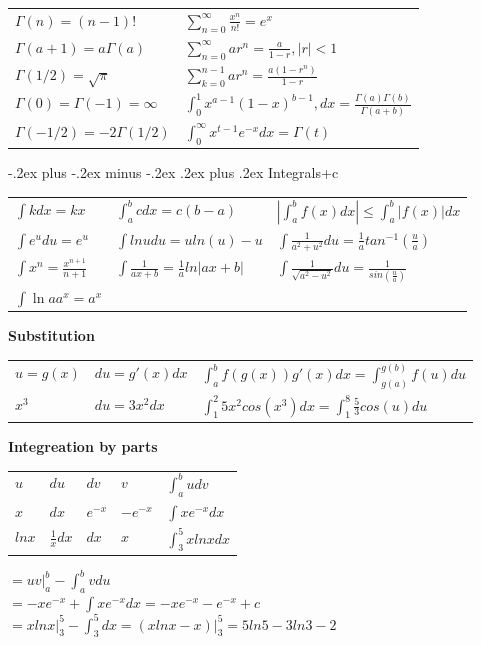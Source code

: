 \documentclass[10pt,landscape]{article}
\makeatletter
\renewcommand{\subsubsection}{\@startsection{subsubsection}{3}{0mm}%
                                {-.2ex plus -.2ex minus -.2ex}%
                                {.2ex plus .2ex}%
                                {\normalfont\small\bfseries}}
\makeatother
\begin{document}
\begin{multicols}{1}
\begin{tabular}{ l|l }
$\Gamma(n)=(n-1)!$           & $\sum_{n=0}^{\infty}\frac{x^n}{n!}=e^x$ \\
$\Gamma(a+1)=a\Gamma(a)$     & $\sum_{n=0}^{\infty}{ar^n}=\frac{a}{1-r}, |r|<1$ \\
$\Gamma(1/2)=\sqrt\pi$       & $\sum_{k=0}^{n-1}{ar^n}=\frac{a(1-r^n)}{1-r}$ \\
$\Gamma(0)=\Gamma(-1)=\infty$& $\int_0^1 x^{a - 1}(1-x)^{b-1}, dx = \frac{\Gamma(a)\Gamma(b)}{\Gamma(a+b)}$ \\
$\Gamma(-1/2)=-2\Gamma(1/2)$ & $\int_0^\infty x^{t-1}e^{-x}dx = \Gamma(t)$ 
\end{tabular}


  \subsubsection{Integrals+c}

\begin{tabular}{ l|l|l }
$\int{k}dx=kx$ & $\int_a^b{c}dx=c(b-a)$   & $|\int_a^b{f(x)}dx|\le \int_a^b|{f(x)}|dx$ \\
$\int{e^u}du=e^u$ & $\int{lnu}du=uln(u)-u$& $\int\frac1{a^2+u^2}du=\frac1{a}tan^{-1}(\frac{u}a)$ \\
$\int{x^n}=\frac{x^{n+1}}{n+1}$ & $\int\frac1{ax+b}=\frac{1}aln|ax+b|$ & $\int\frac1{\sqrt{a^2-u^2}}du=\frac1{sin(\frac{u}a)}$ \\
$\int{\ln{a}a^x}=a^x$ &
\end{tabular}

\textbf{Substitution}
\begin{tabular}{ l|l|l }
$u=g(x)$ & $du=g'(x)dx$ & $\int_a^b{f(g(x))}g'(x)dx=\int_{g(a)}^{g(b)}{f(u)}du $ \\
$x^3$    & $du=3x^2dx$  & $\int_1^2{5x^2}cos(x^3)dx=\int_1^8\frac53{cos(u)}du $ \\
\end{tabular}

\textbf{Integreation by parts}
\begin{tabular}{ l|l|l|l|l }
$u$ & $du$ & $dv$     & $v$        & $\int_a^b{u}dv$ \\
$x$ & $dx$ & $e^{-x}$ & $-e^{-x}$  & $\int{x}e^{-x}dx$ \\ 
$lnx$ & $\frac1x{dx}$ & $dx$ & $x$ & $\int_3^5{x}lnxdx$ 
\end{tabular}

$=\left.uv\right|_a^b-\int_a^b{v}du $ \\
$=-xe^{-x}+\int{x}e^{-x}dx=-xe^{-x}-e^{-x}+c $ \\
$=\left.xlnx\right|_3^5-\int_3^5dx=\left.(xlnx-x)\right|_3^5=5ln5-3ln3-2 $


\end{multicols}
\end{document}

